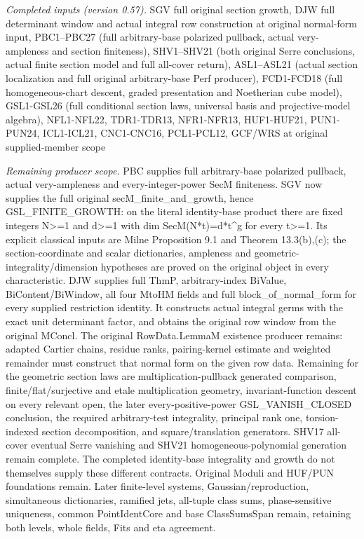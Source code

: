 \emph{Completed inputs (version 0.57).} SGV full original section growth, DJW full determinant window and actual integral row construction at original normal-form input, PBC1–PBC27 (full arbitrary-base polarized pullback, actual very-ampleness and section finiteness), SHV1–SHV21 (both original Serre conclusions, actual finite section model and full all-cover return), ASL1–ASL21 (actual section localization and full original arbitrary-base Perf producer), FCD1-FCD18 (full homogeneous-chart descent, graded presentation and Noetherian cube model), GSL1-GSL26 (full conditional section laws, universal basis and projective-model algebra), NFL1-NFL22, TDR1-TDR13, NFR1-NFR13, HUF1-HUF21, PUN1-PUN24, ICL1-ICL21, CNC1-CNC16, PCL1-PCL12, GCF/WRS at original supplied-member scope

\emph{Remaining producer scope.} PBC supplies full arbitrary-base polarized pullback, actual very-ampleness and every-integer-power SecM finiteness. SGV now supplies the full original secM\_\allowbreak finite\_\allowbreak and\_\allowbreak growth, hence GSL\_\allowbreak FINITE\_\allowbreak GROWTH: on the literal identity-base product there are fixed integers N>=1 and d>=1 with dim SecM(N*t)=d*t\textasciicircum{}g for every t>=1. Its explicit classical inputs are Milne Proposition 9.1 and Theorem 13.3(b),(c); the section-coordinate and scalar dictionaries, ampleness and geometric-integrality/dimension hypotheses are proved on the original object in every characteristic. DJW supplies full ThmP, arbitrary-index BiValue, BiContent/BiWindow, all four MtoHM fields and full block\_\allowbreak of\_\allowbreak normal\_\allowbreak form for every supplied restriction identity. It constructs actual integral germs with the exact unit determinant factor, and obtains the original row window from the original MConcl. The original RowData.LemmaM existence producer remains: adapted Cartier chains, residue ranks, pairing-kernel estimate and weighted remainder must construct that normal form on the given row data. Remaining for the geometric section laws are multiplication-pullback generated comparison, finite/flat/surjective and etale multiplication geometry, invariant-function descent on every relevant open, the later every-positive-power GSL\_\allowbreak VANISH\_\allowbreak CLOSED conclusion, the required arbitrary-test integrality, principal rank one, torsion-indexed section decomposition, and square/translation generators. SHV17 all-cover eventual Serre vanishing and SHV21 homogeneous-polynomial generation remain complete. The completed identity-base integrality and growth do not themselves supply these different contracts. Original Moduli and HUF/PUN foundations remain. Later finite-level systems, Gaussian/reproduction, simultaneous dictionaries, ramified jets, all-tuple class sums, phase-sensitive uniqueness, common PointIdentCore and base ClassSumsSpan remain, retaining both levels, whole fields, Fits and eta agreement.



